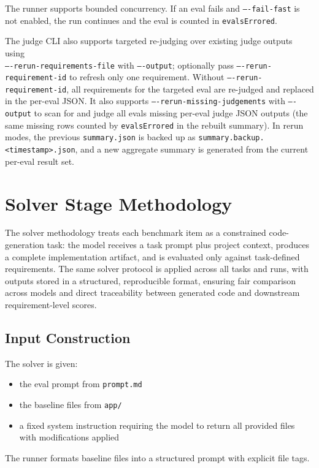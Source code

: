 \documentclass[11pt]{article}
\begin{document}
The runner supports bounded concurrency. If an eval fails and \texttt{----fail-fast} is not enabled, the run continues and the eval is counted in \texttt{evalsErrored}.

The judge CLI also supports targeted re-judging over existing judge outputs using \\\texttt{----rerun-requirements-file} with \texttt{----output}; optionally pass \texttt{----rerun-requirement-id} to refresh only one requirement. Without \texttt{----rerun-requirement-id}, all requirements for the targeted eval are re-judged and replaced in the per-eval JSON. It also supports \texttt{----rerun-missing-judgements} with \texttt{----output} to scan for and judge all evals missing per-eval judge JSON outputs (the same missing rows counted by \texttt{evalsErrored} in the rebuilt summary). In rerun modes, the previous \texttt{summary.json} is backed up as \texttt{summary.backup.<timestamp>.json}, and a new aggregate summary is generated from the current per-eval result set.

\section{Solver Stage Methodology}

The solver methodology treats each benchmark item as a constrained code-generation task: the model receives a task prompt plus project context, produces a complete implementation artifact, and is evaluated only against task-defined requirements. The same solver protocol is applied across all tasks and runs, with outputs stored in a structured, reproducible format, ensuring fair comparison across models and direct traceability between generated code and downstream requirement-level scores.

\subsection{Input Construction}
The solver is given:
\begin{itemize}
  \item the eval prompt from \texttt{prompt.md}
  \item the baseline files from \texttt{app/}
  \item a fixed system instruction requiring the model to return all provided files with modifications applied
\end{itemize}

The runner formats baseline files into a structured prompt with explicit file tags.
\end{document}
